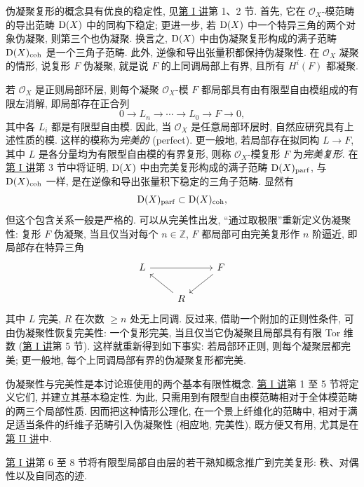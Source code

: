 伪凝聚复形的概念具有优良的稳定性, 见\hyperlink{sga6.e01.expose}{第 I 讲}第 1、2 节. 首先, 它在 \(\mathcal O_X\)-模范畴的导出范畴 \(\mathrm D(X)\) 中的同构下稳定; 更进一步, 若 \(\mathrm D(X)\) 中一个特异三角的两个对象伪凝聚, 则第三个也伪凝聚. 换言之, \(\mathrm D(X)\) 中由伪凝聚复形构成的满子范畴 \(\mathrm D(X)_{\mathrm{coh}}\) 是一个三角子范畴. 此外, 逆像和导出张量积都保持伪凝聚性. 在 \(\mathcal O_X\) 凝聚的情形, 说复形 \(F\) 伪凝聚, 就是说 \(F\) 的上同调局部上有界, 且所有 \(H^i(F)\) 都凝聚.

若 \(\mathcal O_X\) 是正则局部环层, 则每个凝聚 \(\mathcal O_X\)-模 \(F\) 都局部具有由有限型自由模组成的有限左消解, 即局部存在正合列
\[
  0\longrightarrow L_n\longrightarrow \cdots \longrightarrow L_0\longrightarrow F\longrightarrow 0,
\]
其中各 \(L_i\) 都是有限型自由模. 因此, 当 \(\mathcal O_X\) 是任意局部环层时, 自然应研究具有上述性质的模. 这样的模称为\emph{完美的} (perfect). 更一般地, 若局部存在拟同构 \(L\to F\), 其中 \(L\) 是各分量均为有限型自由模的有界复形, 则称 \(\mathcal O_X\)-模复形 \(F\) 为\emph{完美复形}. 在\hyperlink{sga6.e01.expose}{第 I 讲}第 3 节中将证明, \(\mathrm D(X)\) 中由完美复形构成的满子范畴 \(\mathrm D(X)_{\mathrm{parf}}\), 与 \(\mathrm D(X)_{\mathrm{coh}}\) 一样, 是在逆像和导出张量积下稳定的三角子范畴. 显然有
\[
  \mathrm D(X)_{\mathrm{parf}}\subset \mathrm D(X)_{\mathrm{coh}},
\]
但这个包含关系一般是严格的. 可以从完美性出发, “通过取极限”重新定义伪凝聚性: 复形 \(F\) 伪凝聚, 当且仅当对每个 \(n\in\mathbb Z\), \(F\) 都局部可由完美复形作 \(n\) 阶逼近, 即局部存在特异三角
\[
\begin{tikzcd}
L \arrow[rr] && F \arrow[dl]\\
& R \arrow[ul] &
\end{tikzcd}
\]
其中 \(L\) 完美, \(R\) 在次数 \(\geq n\) 处无上同调. 反过来, 借助一个附加的正则性条件, 可由伪凝聚性恢复完美性: 一个复形完美, 当且仅当它伪凝聚且局部具有有限 Tor 维数 (\hyperlink{sga6.e01.expose}{第 I 讲}第 5 节). 这样就重新得到如下事实: 若局部环正则, 则每个凝聚层都完美; 更一般地, 每个上同调局部有界的伪凝聚复形都完美.

伪凝聚性与完美性是本讨论班使用的两个基本有限性概念. \hyperlink{sga6.e01.expose}{第 I 讲}第 1 至 5 节将定义它们, 并建立其基本稳定性. 为此, 只需用到有限型自由模范畴相对于全体模范畴的两三个局部性质. 因而把这种情形公理化, 在一个景上纤维化的范畴中, 相对于满足适当条件的纤维子范畴引入伪凝聚性 (相应地, 完美性), 既方便又有用, 尤其是在\hyperlink{sga6.e02.expose}{第 II 讲}中.

\hyperlink{sga6.e01.expose}{第 I 讲}第 6 至 8 节将有限型局部自由层的若干熟知概念推广到完美复形: 秩、对偶性以及自同态的迹.

